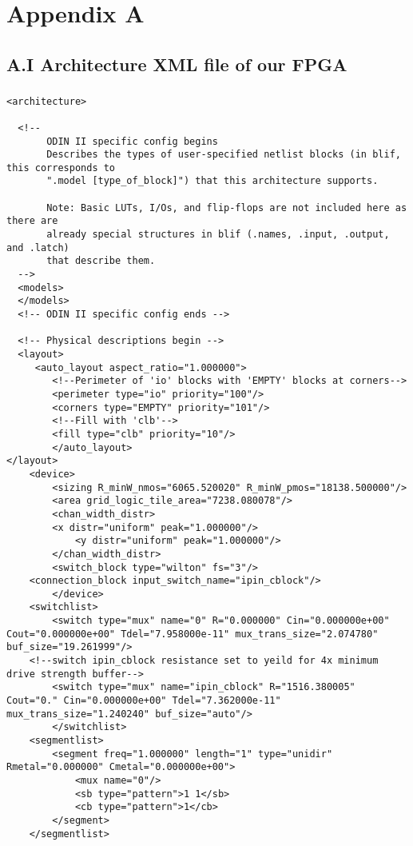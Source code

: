 \def\code#1{\texttt{#1}}
\chapter{Appendix A}
\label{chap:intro}
\vspace{-0.3 cm}


\section{A.I \qquad Architecture XML file of our FPGA}

\paragraph{}
\begin{lstlisting}
<architecture>

  <!-- 
       ODIN II specific config begins 
       Describes the types of user-specified netlist blocks (in blif, this corresponds to 
       ".model [type_of_block]") that this architecture supports.

       Note: Basic LUTs, I/Os, and flip-flops are not included here as there are 
       already special structures in blif (.names, .input, .output, and .latch) 
       that describe them.
  -->
  <models>
  </models>
  <!-- ODIN II specific config ends -->

  <!-- Physical descriptions begin -->
  <layout>
     <auto_layout aspect_ratio="1.000000">
        <!--Perimeter of 'io' blocks with 'EMPTY' blocks at corners-->
        <perimeter type="io" priority="100"/>
        <corners type="EMPTY" priority="101"/>
        <!--Fill with 'clb'-->
        <fill type="clb" priority="10"/>
        </auto_layout>
</layout>
	<device>
		<sizing R_minW_nmos="6065.520020" R_minW_pmos="18138.500000"/>
		<area grid_logic_tile_area="7238.080078"/>
		<chan_width_distr>
		<x distr="uniform" peak="1.000000"/>
			<y distr="uniform" peak="1.000000"/>
		</chan_width_distr>
		<switch_block type="wilton" fs="3"/>
	<connection_block input_switch_name="ipin_cblock"/>
        </device>
	<switchlist>
		<switch type="mux" name="0" R="0.000000" Cin="0.000000e+00" Cout="0.000000e+00" Tdel="7.958000e-11" mux_trans_size="2.074780" buf_size="19.261999"/>
	<!--switch ipin_cblock resistance set to yeild for 4x minimum drive strength buffer-->
        <switch type="mux" name="ipin_cblock" R="1516.380005" Cout="0." Cin="0.000000e+00" Tdel="7.362000e-11" mux_trans_size="1.240240" buf_size="auto"/>
        </switchlist>
	<segmentlist>
		<segment freq="1.000000" length="1" type="unidir" Rmetal="0.000000" Cmetal="0.000000e+00">
			<mux name="0"/>
			<sb type="pattern">1 1</sb>
			<cb type="pattern">1</cb>
		</segment>
	</segmentlist>


\end{lstlisting}
